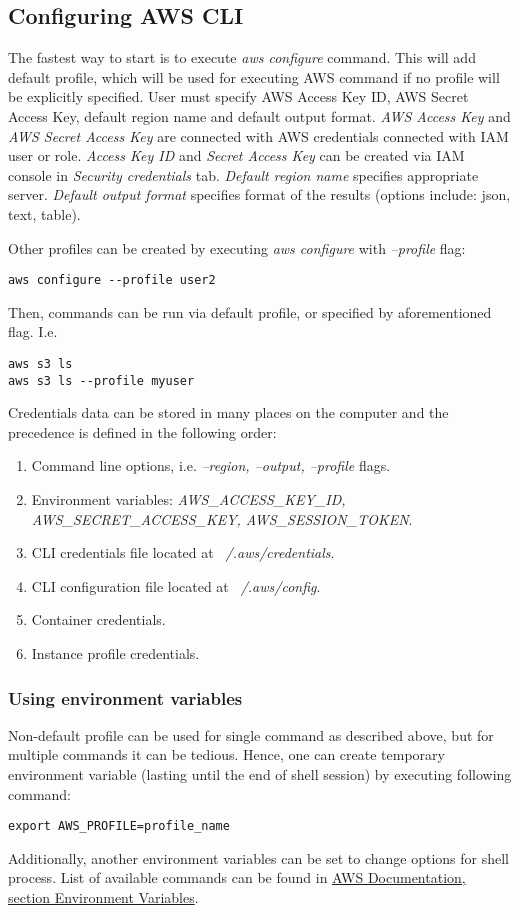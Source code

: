 \documentclass[11pt,english]{article}
\begin{document}
\subsection{Configuring AWS CLI}
The fastest way to start is to execute \textit{aws configure} command. This will add default profile, which will be used for executing AWS command if no profile will be explicitly specified. User must specify AWS Access Key ID, AWS Secret Access Key, default region name and default output format. \textit{AWS Access Key} and \textit{AWS Secret Access Key} are connected with AWS credentials connected with IAM user or role. \textit{Access Key ID} and \textit{Secret Access Key} can be created via IAM console in \textit{Security credentials} tab. \textit{Default region name} specifies appropriate server. \textit{Default output format} specifies format of the results (options include: json, text, table).

Other profiles can be created by executing \textit{aws configure} with \textit{--profile} flag:
\begin{lstlisting}
aws configure --profile user2
\end{lstlisting}
Then, commands can be run via default profile, or specified by aforementioned flag. I.e.
\begin{lstlisting}
aws s3 ls
aws s3 ls --profile myuser
\end{lstlisting}

Credentials data can be stored in many places on the computer and the precedence is defined in the following order:
\begin{enumerate}
	\item Command line options, i.e. \textit{--region, --output, --profile} flags.
	\item Environment variables: \textit{AWS\_ACCESS\_KEY\_ID, AWS\_SECRET\_ACCESS\_KEY, AWS\_SESSION\_TOKEN}.
	\item CLI credentials file located at \textit{~/.aws/credentials}.
	\item CLI configuration file located at \textit{~/.aws/config}.
	\item Container credentials.
	\item Instance profile credentials.
\end{enumerate}

\subsubsection*{Using environment variables}
Non-default profile can be used for single command as described above, but for multiple commands it can be tedious. Hence, one can create temporary environment variable (lasting until the end of shell session) by executing following command:
\begin{lstlisting}
export AWS_PROFILE=profile_name
\end{lstlisting}
Additionally, another environment variables can be set to change options for shell process. List of available commands can be found in \href{https://docs.aws.amazon.com/cli/latest/userguide/cli-configure-envvars.html}{AWS Documentation, section Environment Variables}.
\end{document}
